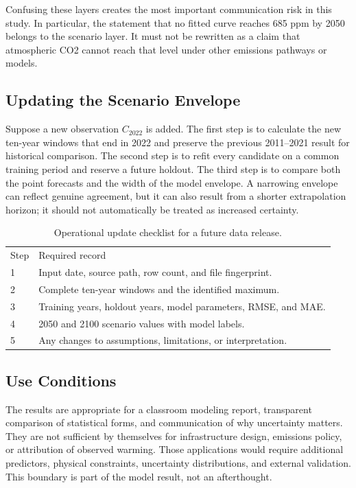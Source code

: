 \documentclass{mcmthesis}
\begin{document}
\begin{appendices}
Confusing these layers creates the most important communication risk in this study. In particular, the statement that no fitted curve reaches 685 ppm by 2050 belongs to the scenario layer. It must not be rewritten as a claim that atmospheric CO2 cannot reach that level under other emissions pathways or models.

\subsection{Updating the Scenario Envelope}
Suppose a new observation $C_{2022}$ is added. The first step is to calculate the new ten-year windows that end in 2022 and preserve the previous 2011--2021 result for historical comparison. The second step is to refit every candidate on a common training period and reserve a future holdout. The third step is to compare both the point forecasts and the width of the model envelope. A narrowing envelope can reflect genuine agreement, but it can also result from a shorter extrapolation horizon; it should not automatically be treated as increased certainty.

\begin{table}[H]
\centering
\small
\caption{Operational update checklist for a future data release.}
\begin{tabularx}{\textwidth}{lX}
\toprule
Step & Required record \\
1 & Input date, source path, row count, and file fingerprint. \\
2 & Complete ten-year windows and the identified maximum. \\
3 & Training years, holdout years, model parameters, RMSE, and MAE. \\
4 & 2050 and 2100 scenario values with model labels. \\
5 & Any changes to assumptions, limitations, or interpretation. \\
\bottomrule
\end{tabularx}
\end{table}

\subsection{Use Conditions}
The results are appropriate for a classroom modeling report, transparent comparison of statistical forms, and communication of why uncertainty matters. They are not sufficient by themselves for infrastructure design, emissions policy, or attribution of observed warming. Those applications would require additional predictors, physical constraints, uncertainty distributions, and external validation. This boundary is part of the model result, not an afterthought.


\end{appendices}
\end{document}
